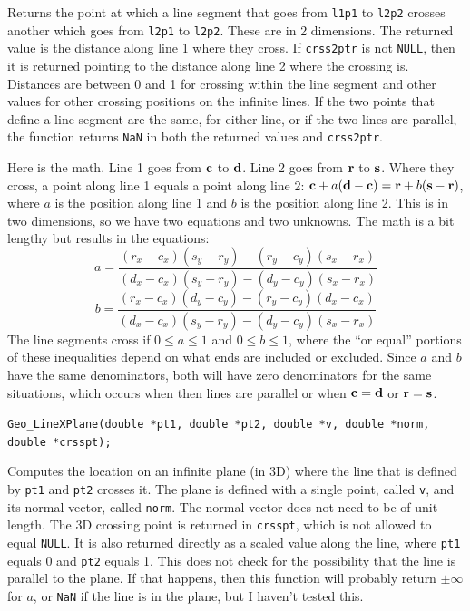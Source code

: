 \documentclass[11pt]{article}
\newcommand {\ttt} {\texttt}
\begin{document}
\begin{description}
Returns the point at which a line segment that goes from \ttt{l1p1} to \ttt{l2p2} crosses another which goes from \ttt{l2p1} to \ttt{l2p2}. These are in 2 dimensions. The returned value is the distance along line 1 where they cross. If \ttt{crss2ptr} is not \ttt{NULL}, then it is returned pointing to the distance along line 2 where the crossing is. Distances are between 0 and 1 for crossing within the line segment and other values for other crossing positions on the infinite lines. If the two points that define a line segment are the same, for either line, or if the two lines are parallel, the function returns \ttt{NaN} in both the returned values and \ttt{crss2ptr}.

Here is the math. Line 1 goes from $\vb{c}$ to $\vb{d}$. Line 2 goes from $\vb{r}$ to $\vb{s}$. Where they cross, a point along line 1 equals a point along line 2: $\vb{c} + a(\vb{d}-\vb{c}) = \vb{r} + b(\vb{s}-\vb{r})$, where $a$ is the position along line 1 and $b$ is the position along line 2. This is in two dimensions, so we have two equations and two unknowns. The math is a bit lengthy but results in the equations:
$$a = \frac{(r_x-c_x)(s_y-r_y) - (r_y-c_y)(s_x-r_x)}{(d_x-c_x)(s_y-r_y) - (d_y-c_y)(s_x-r_x)}$$
$$b = \frac{(r_x-c_x)(d_y-c_y) - (r_y-c_y)(d_x-c_x)}{(d_x-c_x)(s_y-r_y) - (d_y-c_y)(s_x-r_x)}$$
The line segments cross if $0 \leq a \leq 1$ and $0 \leq b \leq 1$, where the ``or equal'' portions of these inequalities depend on what ends are included or excluded. Since $a$ and $b$ have the same denominators, both will have zero denominators for the same situations, which occurs when then lines are parallel or when $\vb{c} = \vb{d}$ or $\vb{r} = \vb{s}$.

\item[\ttt{double}]
\ttt{Geo\_LineXPlane(double *pt1, double *pt2, double *v, double *norm, double *crsspt);}

Computes the location on an infinite plane (in 3D) where the line that is defined by \ttt{pt1} and \ttt{pt2} crosses it. The plane is defined with a single point, called \ttt{v}, and its normal vector, called \ttt{norm}. The normal vector does not need to be of unit length. The 3D crossing point is returned in \ttt{crsspt}, which is not allowed to equal \ttt{NULL}. It is also returned directly as a scaled value along the line, where \ttt{pt1} equals 0 and \ttt{pt2} equals 1. This does not check for the possibility that the line is parallel to the plane. If that happens, then this function will probably return $\pm \infty$ for $a$, or \ttt{NaN} if the line is in the plane, but I haven't tested this.


\end{description}
\end{document}
